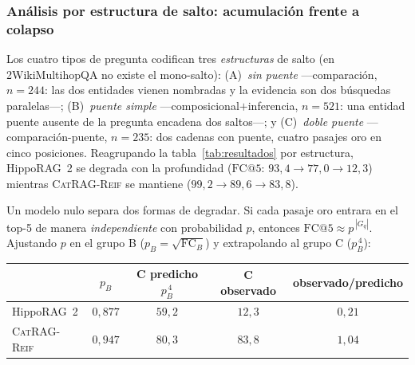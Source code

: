 \documentclass[11pt,a4paper]{article}
\newcommand{\sys}{\textsc{CatRAG-Reif}}          %
\newcommand{\hippo}{HippoRAG~2}
\begin{document}

\subsubsection{Análisis por estructura de salto: acumulación frente a colapso}
\label{sec:saltos}

Los cuatro tipos de pregunta codifican tres \emph{estructuras} de salto (en
2WikiMultihopQA no existe el mono-salto): (A)~\emph{sin puente} ---comparación,
$n{=}244$: las dos entidades vienen nombradas y la evidencia son dos búsquedas
paralelas---; (B)~\emph{puente simple} ---composicional$+$inferencia,
$n{=}521$: una entidad puente ausente de la pregunta encadena dos saltos---; y
(C)~\emph{doble puente} ---comparación-puente, $n{=}235$: dos cadenas con
puente, cuatro pasajes oro en cinco posiciones. Reagrupando la
tabla~\ref{tab:resultados} por estructura, \hippo{} se degrada con la
profundidad ($\mathrm{FC@}5$: $93{,}4 \to 77{,}0 \to 12{,}3$) mientras \sys{}
se mantiene ($99{,}2 \to 89{,}6 \to 83{,}8$).

Un modelo nulo separa dos formas de degradar. Si cada pasaje oro entrara en el
top-5 de manera \emph{independiente} con probabilidad $p$, entonces
$\mathrm{FC@}5 \approx p^{\,|G_q|}$. Ajustando $p$ en el grupo B
($p_B=\sqrt{\mathrm{FC}_B}$) y extrapolando al grupo C ($p_B^{\,4}$):

\begin{center}\small
\begin{tabular}{lcccc}
\toprule
 & $p_B$ & C predicho $p_B^{\,4}$ & C observado & observado/predicho\\
\midrule
\hippo{} & $0{,}877$ & $59{,}2$ & $12{,}3$ & $0{,}21$\\
\sys{}   & $0{,}947$ & $80{,}3$ & $83{,}8$ & $1{,}04$\\
\bottomrule
\end{tabular}
\end{center}
\end{document}
